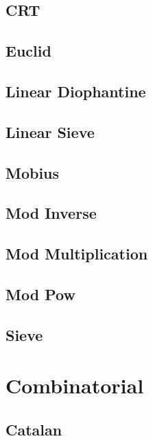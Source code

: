 \subsection{CRT}
\raggedbottom
\hrulefill
\subsection{Euclid}
\raggedbottom
\hrulefill
\subsection{Linear Diophantine}
\raggedbottom
\hrulefill
\subsection{Linear Sieve}
\raggedbottom
\hrulefill
\subsection{Mobius}
\raggedbottom
\hrulefill
\subsection{Mod Inverse}
\raggedbottom
\hrulefill
\subsection{Mod Multiplication}
\raggedbottom
\hrulefill
\subsection{Mod Pow}
\raggedbottom
\hrulefill
\subsection{Sieve}
\raggedbottom
\hrulefill
\newpage

\section{Combinatorial}
\subsection{Catalan}
\raggedbottom
\hrulefill
